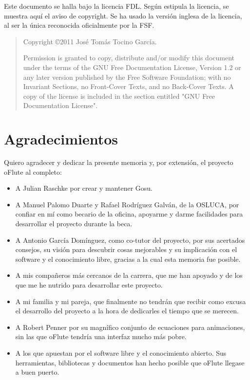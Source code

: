 \documentclass[a4paper,12pt]{scrbook}
\begin{document}




\cleardoublepage



\cleardoublepage
\bigskip
\bigskip

Este documento se halla bajo la licencia \ac{FDL}. Según estipula la
licencia, se muestra aquí el aviso de copyright. Se ha usado la
versión inglesa de la licencia, al ser la única reconocida
oficialmente por la \ac{FSF}.

\begin{quote}
  Copyright \copyright  2011 José Tomás Tocino García.
  
  Permission is granted to copy, distribute and/or modify this document
  under the terms of the GNU Free Documentation License, Version 1.2
  or any later version published by the Free Software Foundation;
  with no Invariant Sections, no Front-Cover Texts, and no Back-Cover Texts.
  A copy of the license is included in the section entitled "GNU
  Free Documentation License".
\end{quote}

\cleardoublepage

\section*{Agradecimientos}
Quiero agradecer y dedicar la presente memoria y, por extensión, el proyecto
oFlute al completo:
\begin{itemize}
\item A Julian Raschke por crear y mantener Gosu.
\item A Manuel Palomo Duarte y Rafael Rodríguez Galván, de la OSLUCA, por confiar en mí
  como becario de la oficina, apoyarme y darme facilidades para desarrollar el
  proyecto durante la beca.
\item A Antonio García Domínguez, como co-tutor del proyecto, por sus acertados
  consejos, su visión para descubrir cosas mejorables y su implicación con el
  software y el conocimiento libre, gracias a la cual esta memoria fue posible.
\item A mis compañeros más cercanos de la carrera, que me han apoyado y de los
  que me he nutrido para desarrollar este proyecto.
\item A mi familia y mi pareja, que finalmente no tendrán que recibir como
  excusa el desarrollo del proyecto a la hora de dedicarles el tiempo que se
  merecen.
\item A Robert Penner por su magnífico conjunto de ecuaciones para animaciones,
  sin las que oFlute tendría una interfaz mucho más pobre.
\item A los que apuestan por el software libre y el conocimiento abierto. Sus
  herramientas, bibliotecas y documentos han hecho posible que oFlute llegase a
  buen puerto.
\end{itemize}
\end{document}
